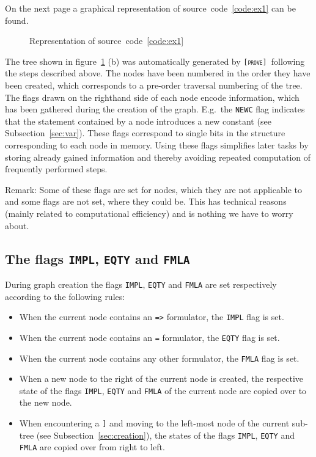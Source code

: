 \documentclass[british]{article}
\newcommand\prv{bc}
\newcommand\m[1]{\texttt{#1}}
\newcommand\name{\texttt{\textsc{[prove]}}}
\begin{document}
On the next page a graphical representation of
source~code~\ref{code:ex1} can be found.
\pagebreak{}

\begin{figure}[!ht]
\caption{Representation of source~code~\ref{code:ex1}}\label{fig:ex1}
\centering
{}
\end{figure}

The tree shown in figure~\ref{fig:ex1} (b) was automatically generated by \name\
following the steps described above. The nodes have been numbered in the order
they have been created, which corresponds to a pre-order traversal numbering of
the tree. The flags drawn on the righthand side of each node encode information,
which has been gathered during the creation of the graph.  E.g.\ the
\texttt{NEWC} flag indicates that the statement contained by a node introduces a
new constant (see Subsection~\ref{sec:var}). These flags correspond to single bits in the
structure corresponding to each node in memory. Using these flags simplifies
later tasks by storing already gained information and thereby avoiding repeated
computation of frequently performed steps.\newline

Remark: Some of these flags are set for nodes, which they are not applicable to
and some flags are not set, where they could be.
This has technical reasons (mainly related to computational efficiency) and is
nothing we have to worry about.

\pagebreak{}

\subsection{The flags \texttt{IMPL}, \texttt{EQTY} and \texttt{FMLA}}
During graph creation the flags \texttt{IMPL},
\texttt{EQTY} and \texttt{FMLA} are set respectively according to the following
rules:

\begin{itemize}
	\item
		When the current node contains an \m{=>} formulator, the \texttt{IMPL}
		flag is set.
	\item
		When the current node contains an \m{=} formulator, the \texttt{EQTY}
		flag is set.
	\item
		When the current node contains any other formulator, the \texttt{FMLA}
		flag is set.
	\item
		When a new node to the right of the current node is created, the
		respective state of the flags \texttt{IMPL}, \texttt{EQTY} and
		\texttt{FMLA} of the current node are copied over to the new node.
	\item
		When encountering a \m{]} and moving to the left-most node of the
		current sub-tree (see Subsection~\ref{sec:creation}), the states of the
		flags \texttt{IMPL}, \texttt{EQTY} and \texttt{FMLA} are copied over
		from right to left.
\end{itemize}
\end{document}
